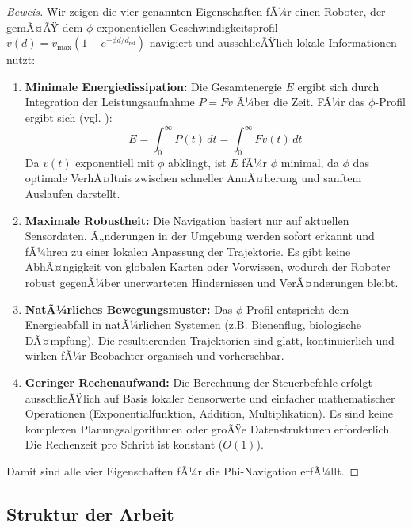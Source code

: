 ﻿\documentclass[a4paper,12pt]{article}
\theoremstyle{definition}
\begin{document}
\begin{proof}[Beweis]
	Wir zeigen die vier genannten Eigenschaften fÃ¼r einen Roboter, der gemÃ¤ÃŸ dem $\phi$-exponentiellen Geschwindigkeitsprofil $v(d) = v_{\max}(1 - e^{-\phi d/d_{\text{ref}}})$ navigiert und ausschlieÃŸlich lokale Informationen nutzt:
	\begin{enumerate}
		\item \textbf{Minimale Energiedissipation:} Die Gesamtenergie $E$ ergibt sich durch Integration der Leistungsaufnahme $P = Fv$ Ã¼ber die Zeit. FÃ¼r das $\phi$-Profil ergibt sich (vgl. \cite{phi_energy}):
		\[
		E = \int_0^\infty P(t)\,dt = \int_0^\infty F v(t)\,dt
		\]
		Da $v(t)$ exponentiell mit $\phi$ abklingt, ist $E$ fÃ¼r $\phi$ minimal, da $\phi$ das optimale VerhÃ¤ltnis zwischen schneller AnnÃ¤herung und sanftem Auslaufen darstellt.
		\item \textbf{Maximale Robustheit:} Die Navigation basiert nur auf aktuellen Sensordaten. Ã„nderungen in der Umgebung werden sofort erkannt und fÃ¼hren zu einer lokalen Anpassung der Trajektorie. Es gibt keine AbhÃ¤ngigkeit von globalen Karten oder Vorwissen, wodurch der Roboter robust gegenÃ¼ber unerwarteten Hindernissen und VerÃ¤nderungen bleibt.
		\item \textbf{NatÃ¼rliches Bewegungsmuster:} Das $\phi$-Profil entspricht dem Energieabfall in natÃ¼rlichen Systemen (z.B. Bienenflug, biologische DÃ¤mpfung). Die resultierenden Trajektorien sind glatt, kontinuierlich und wirken fÃ¼r Beobachter organisch und vorhersehbar.
		\item \textbf{Geringer Rechenaufwand:} Die Berechnung der Steuerbefehle erfolgt ausschlieÃŸlich auf Basis lokaler Sensorwerte und einfacher mathematischer Operationen (Exponentialfunktion, Addition, Multiplikation). Es sind keine komplexen Planungsalgorithmen oder groÃŸe Datenstrukturen erforderlich. Die Rechenzeit pro Schritt ist konstant ($O(1)$).
	\end{enumerate}
	Damit sind alle vier Eigenschaften fÃ¼r die Phi-Navigation erfÃ¼llt.
\end{proof}

\subsection{Struktur der Arbeit}
\end{document}

